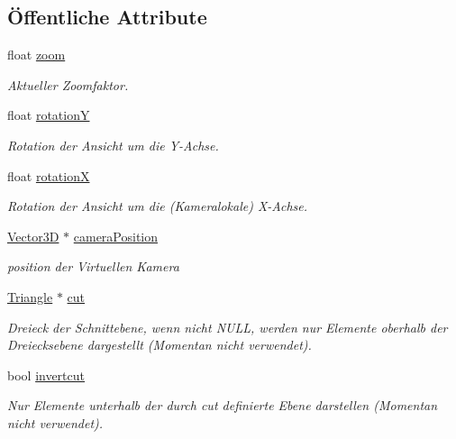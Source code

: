 \subsection*{Öffentliche Attribute}
\begin{DoxyCompactItemize}
\item 
float \hyperlink{structRenderer_1_1Viewport__info_a9bbc5e50fed7334fb237e620e6080e5e}{zoom}
\begin{DoxyCompactList}\small\item\em Aktueller Zoomfaktor. \end{DoxyCompactList}\item 
float \hyperlink{structRenderer_1_1Viewport__info_a80fe2d86956d26105dd8301278e0c4e6}{rotation\-Y}
\begin{DoxyCompactList}\small\item\em Rotation der Ansicht um die Y-\/\-Achse. \end{DoxyCompactList}\item 
float \hyperlink{structRenderer_1_1Viewport__info_ad8005e4eaa631f4c6b96cf6be05e8428}{rotation\-X}
\begin{DoxyCompactList}\small\item\em Rotation der Ansicht um die (Kameralokale) X-\/\-Achse. \end{DoxyCompactList}\item 
\hyperlink{classVector3D}{Vector3\-D} $\ast$ \hyperlink{structRenderer_1_1Viewport__info_aa6b5d9d9dbde8c74e25af98680b7ccce}{camera\-Position}
\begin{DoxyCompactList}\small\item\em position der Virtuellen Kamera \end{DoxyCompactList}\item 
\hyperlink{classTriangle}{Triangle} $\ast$ \hyperlink{structRenderer_1_1Viewport__info_af6fe77b0bf872e7d65079bb58e9e8cce}{cut}
\begin{DoxyCompactList}\small\item\em Dreieck der Schnittebene, wenn nicht N\-U\-L\-L, werden nur Elemente oberhalb der Dreiecksebene dargestellt (Momentan nicht verwendet). \end{DoxyCompactList}\item 
bool \hyperlink{structRenderer_1_1Viewport__info_a0e06e17e13e9639179de762f6a45c71e}{invertcut}
\begin{DoxyCompactList}\small\item\em Nur Elemente unterhalb der durch cut definierte Ebene darstellen (Momentan nicht verwendet). \end{DoxyCompactList}\item 

\end{DoxyCompactItemize}
